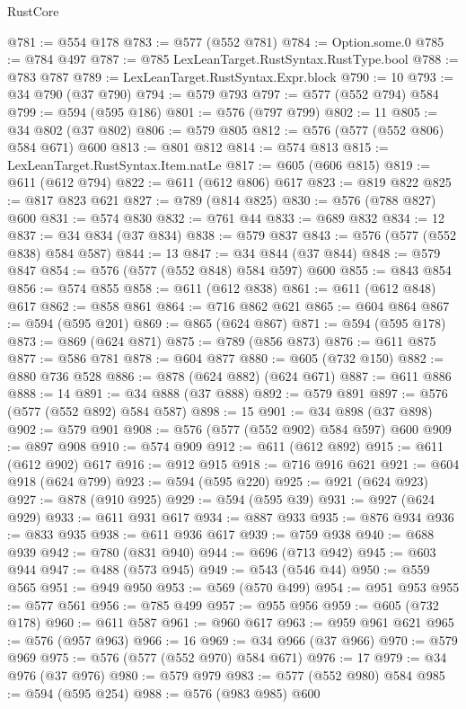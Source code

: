 \begin{lexlean}{RustCore}
\begin{coremodule}
@781 := @554 @178
@783 := @577 (@552 @781)
@784 := Option.some.{0}
@785 := @784 @497
@787 := @785 LexLeanTarget.RustSyntax.RustType.bool
@788 := @783 @787
@789 := LexLeanTarget.RustSyntax.Expr.block
@790 := 10
@793 := @34 @790 (@37 @790)
@794 := @579 @793
@797 := @577 (@552 @794) @584
@799 := @594 (@595 @186)
@801 := @576 (@797 @799)
@802 := 11
@805 := @34 @802 (@37 @802)
@806 := @579 @805
@812 := @576 (@577 (@552 @806) @584 @671) @600
@813 := @801 @812
@814 := @574 @813
@815 := LexLeanTarget.RustSyntax.Item.natLe
@817 := @605 (@606 @815)
@819 := @611 (@612 @794)
@822 := @611 (@612 @806) @617
@823 := @819 @822
@825 := @817 @823 @621
@827 := @789 (@814 @825)
@830 := @576 (@788 @827) @600
@831 := @574 @830
@832 := @761 @44
@833 := @689 @832
@834 := 12
@837 := @34 @834 (@37 @834)
@838 := @579 @837
@843 := @576 (@577 (@552 @838) @584 @587)
@844 := 13
@847 := @34 @844 (@37 @844)
@848 := @579 @847
@854 := @576 (@577 (@552 @848) @584 @597) @600
@855 := @843 @854
@856 := @574 @855
@858 := @611 (@612 @838)
@861 := @611 (@612 @848) @617
@862 := @858 @861
@864 := @716 @862 @621
@865 := @604 @864
@867 := @594 (@595 @201)
@869 := @865 (@624 @867)
@871 := @594 (@595 @178)
@873 := @869 (@624 @871)
@875 := @789 (@856 @873)
@876 := @611 @875
@877 := @586 @781
@878 := @604 @877
@880 := @605 (@732 @150)
@882 := @880 @736 @528
@886 := @878 (@624 @882) (@624 @671)
@887 := @611 @886
@888 := 14
@891 := @34 @888 (@37 @888)
@892 := @579 @891
@897 := @576 (@577 (@552 @892) @584 @587)
@898 := 15
@901 := @34 @898 (@37 @898)
@902 := @579 @901
@908 := @576 (@577 (@552 @902) @584 @597) @600
@909 := @897 @908
@910 := @574 @909
@912 := @611 (@612 @892)
@915 := @611 (@612 @902) @617
@916 := @912 @915
@918 := @716 @916 @621
@921 := @604 @918 (@624 @799)
@923 := @594 (@595 @220)
@925 := @921 (@624 @923)
@927 := @878 (@910 @925)
@929 := @594 (@595 @39)
@931 := @927 (@624 @929)
@933 := @611 @931 @617
@934 := @887 @933
@935 := @876 @934
@936 := @833 @935
@938 := @611 @936 @617
@939 := @759 @938
@940 := @688 @939
@942 := @780 (@831 @940)
@944 := @696 (@713 @942)
@945 := @603 @944
@947 := @488 (@573 @945)
@949 := @543 (@546 @44)
@950 := @559 @565
@951 := @949 @950
@953 := @569 (@570 @499)
@954 := @951 @953
@955 := @577 @561
@956 := @785 @499
@957 := @955 @956
@959 := @605 (@732 @178)
@960 := @611 @587
@961 := @960 @617
@963 := @959 @961 @621
@965 := @576 (@957 @963)
@966 := 16
@969 := @34 @966 (@37 @966)
@970 := @579 @969
@975 := @576 (@577 (@552 @970) @584 @671)
@976 := 17
@979 := @34 @976 (@37 @976)
@980 := @579 @979
@983 := @577 (@552 @980) @584
@985 := @594 (@595 @254)
@988 := @576 (@983 @985) @600

\end{coremodule}
\end{lexlean}
